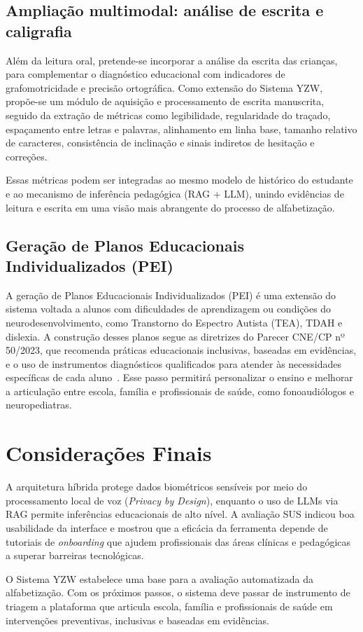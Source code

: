 \documentclass[12pt]{article}
\begin{document}
\subsection{Ampliação multimodal: análise de escrita e caligrafia}
Além da leitura oral, pretende-se incorporar a análise da escrita das crianças, para complementar o diagnóstico educacional com indicadores de grafomotricidade e precisão ortográfica. Como extensão do Sistema YZW, propõe-se um módulo de aquisição e processamento de escrita manuscrita, seguido da extração de métricas como legibilidade, regularidade do traçado, espaçamento entre letras e palavras, alinhamento em linha base, tamanho relativo de caracteres, consistência de inclinação e sinais indiretos de hesitação e correções.

Essas métricas podem ser integradas ao mesmo modelo de histórico do estudante e ao mecanismo de inferência pedagógica (RAG + LLM), unindo evidências de leitura e escrita em uma visão mais abrangente do processo de alfabetização.

\subsection{Geração de Planos Educacionais Individualizados (PEI)}

A geração de Planos Educacionais Individualizados (PEI) é uma extensão do sistema voltada a alunos com dificuldades de aprendizagem ou condições do neurodesenvolvimento, como Transtorno do Espectro Autista (TEA), TDAH e dislexia. A construção desses planos segue as diretrizes do Parecer CNE/CP nº 50/2023, que recomenda práticas educacionais inclusivas, baseadas em evidências, e o uso de instrumentos diagnósticos qualificados para atender às necessidades específicas de cada aluno~\cite{cne2023parecer50}.
Esse passo permitirá personalizar o ensino e melhorar a articulação entre escola, família e profissionais de saúde, como fonoaudiólogos e neuropediatras.

\section{Considerações Finais}
\label{sec:consideracoes}

A arquitetura híbrida protege dados biométricos sensíveis por meio do processamento local de voz (\textit{Privacy by Design}), enquanto o uso de LLMs via RAG permite inferências educacionais de alto nível. A avaliação SUS indicou boa usabilidade da interface e mostrou que a eficácia da ferramenta depende de tutoriais de \textit{onboarding} que ajudem profissionais das áreas clínicas e pedagógicas a superar barreiras tecnológicas.

O Sistema YZW estabelece uma base para a avaliação automatizada da alfabetização. Com os próximos passos, o sistema deve passar de instrumento de triagem a plataforma que articula escola, família e profissionais de saúde em intervenções preventivas, inclusivas e baseadas em evidências.



\end{document}

